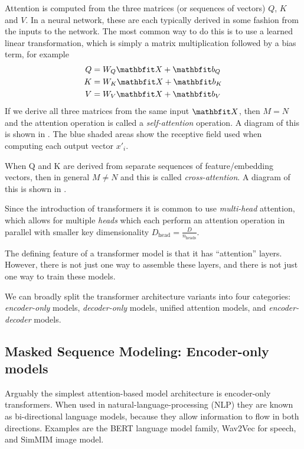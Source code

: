

Attention is computed from the three matrices (or sequences of vectors) $Q$, $K$ and $V$. In a neural network, these are each typically derived in some fashion from the inputs to the network. The most common way to do this is to use a learned linear transformation, which is simply a matrix multiplication followed by a bias term, for example
\begin{align}
\begin{aligned}
\label{eqn:attn-linear}
Q &= W_{Q} \X + \vb_{Q} \\
K &= W_{K} \X + \vb_{K} \\
V &= W_{V} \X + \vb_{V}
\end{aligned}
\end{align}
If we derive all three matrices from the same input $\X$, then $M = N$ and the attention operation is called a \textit{self-attention} operation. A diagram of this is shown in . The blue shaded areas show the receptive field used when computing each output vector $x'_i$.

When Q and K are derived from separate sequences of feature/embedding vectors, then in general $M ≠ N$ and this is called \textit{cross-attention}. A diagram of this is shown in .



Since the introduction of transformers it is common to use \textit{multi-head} attention, which allows for multiple \textit{heads} which each perform an attention operation in parallel with smaller key dimensionality $D_{\text{head}} = \frac{D}{ n_{\text{heads}}}$.

The defining feature of a transformer model is that it has ``attention'' layers. However, there is not just one way to assemble these layers, and there is not just one way to train these models.

We can broadly split the transformer architecture variants into four categories: \textit{encoder-only} models, \textit{decoder-only} models, unified attention models, and \textit{encoder-decoder} models.

\subsection{Masked Sequence Modeling: Encoder-only models}
\label{ss:msm}

Arguably the simplest attention-based model architecture is encoder-only transformers. When used in natural-language-processing (NLP) they are known as bi-directional language models, because they allow information to flow in both directions. Examples are the BERT \cite{bert} language model family, Wav2Vec \cite{wav2vec} for speech, and SimMIM \cite{sim-mim} image model.

